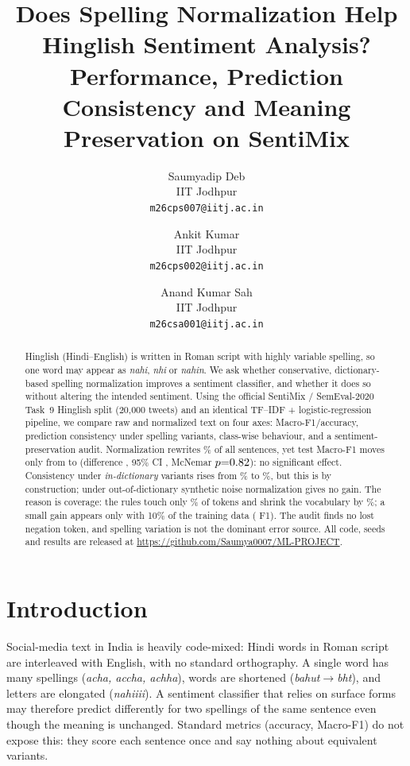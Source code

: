 \documentclass[10pt,twocolumn,letterpaper]{article}
\title{Does Spelling Normalization Help Hinglish Sentiment Analysis?\\
Performance, Prediction Consistency and Meaning Preservation on SentiMix}
\author{Saumyadip Deb\\
IIT Jodhpur\\
{\tt\small m26cps007@iitj.ac.in}
\and
Ankit Kumar\\
IIT Jodhpur\\
{\tt\small m26cps002@iitj.ac.in}
\and
Anand Kumar Sah\\
IIT Jodhpur\\
{\tt\small m26csa001@iitj.ac.in}
}
\newcommand{\RepoURL}{https://github.com/Saumya0007/ML-PROJECT}
\begin{document}
\maketitle

\begin{abstract}
Hinglish (Hindi--English) is written in Roman script with highly variable spelling, so one word may appear as \emph{nahi}, \emph{nhi} or \emph{nahin}. We ask whether conservative, dictionary-based spelling normalization improves a sentiment classifier, and whether it does so without altering the intended sentiment. Using the official SentiMix / SemEval-2020 Task~9 Hinglish split (20{,}000 tweets) and an identical TF--IDF + logistic-regression pipeline, we compare raw and normalized text on four axes: Macro-F1/accuracy, prediction consistency under spelling variants, class-wise behaviour, and a sentiment-preservation audit. Normalization rewrites \ChangedPct\% of all sentences, yet test Macro-F1 moves only from \RawTestF{} to \NormTestF{} (difference \FDiff, 95\% CI \FDiffCI, McNemar $p{=}0.82$): no significant effect. Consistency under \emph{in-dictionary} variants rises from \RobARaw\% to \RobANorm\%, but this is by construction; under out-of-dictionary synthetic noise normalization gives no gain. The reason is coverage: the rules touch only \VocabVarShare\% of tokens and shrink the vocabulary by \TypesRed\%; a small gain appears only with 10\% of the training data (\LCTenDiff{} F1). The audit finds no lost negation token, and spelling variation is not the dominant error source. All code, seeds and results are released at \url{\RepoURL}.
\end{abstract}

\section{Introduction}
\label{sec:intro}
Social-media text in India is heavily code-mixed: Hindi words in Roman script are interleaved with English, with no standard orthography. A single word has many spellings (\emph{acha, accha, achha}), words are shortened (\emph{bahut}$\to$\emph{bht}), and letters are elongated (\emph{nahiiii}). A sentiment classifier that relies on surface forms may therefore predict differently for two spellings of the same sentence even though the meaning is unchanged. Standard metrics (accuracy, Macro-F1) do not expose this: they score each sentence once and say nothing about equivalent variants.
\end{document}
